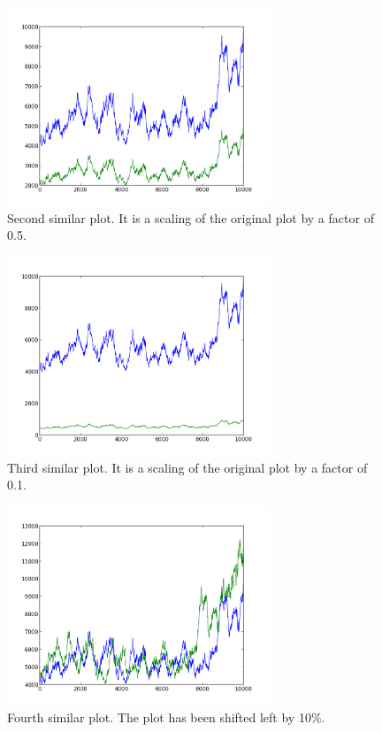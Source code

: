 \begin{figure}[h!]
    \centering
    \includegraphics[width=0.7\textwidth]{images/mutant_2.png}
    \caption{Second similar plot.  It is a scaling of the original plot by a factor of 0.5.}
    \label{fig:mutant_2}
\end{figure}

\begin{figure}[h!]
    \centering
    \includegraphics[width=0.7\textwidth]{images/mutant_3.png}
    \caption{Third similar plot.  It is a scaling of the original plot by a factor of 0.1.}
    \label{fig:mutant_3}
\end{figure}

\begin{figure}[h!]
    \centering
    \includegraphics[width=0.7\textwidth]{images/mutant_4.png}
    \caption{Fourth similar plot.  The plot has been shifted left by 10\%.}
    \label{fig:mutant_4}
\end{figure}

